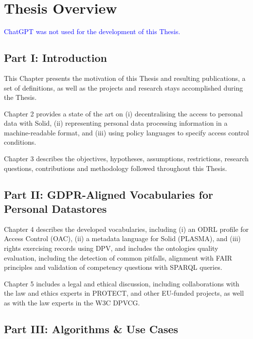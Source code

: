 \section{Thesis Overview}
\label{sec:thesis_overview}

\textcolor{blue}{ChatGPT was not used for the development of this Thesis.}

\subsection*{Part I: Introduction}

This Chapter presents the motivation of this Thesis and resulting publications, a set of definitions, as well as the projects and research stays accomplished during the Thesis.

Chapter 2 provides a state of the art on (i) decentralising the access to personal data with Solid, (ii) representing personal data processing information in a machine-readable format, and (iii) using policy languages to specify access control conditions.

Chapter 3 describes the objectives, hypotheses, assumptions, restrictions, research questions, contributions and methodology followed throughout this Thesis.

\subsection*{Part II: GDPR-Aligned Vocabularies for Personal Datastores}

Chapter 4 describes the developed vocabularies, including (i) an ODRL profile for Access Control (OAC), (ii) a metadata language for Solid (PLASMA), and (iii) rights exercising records using DPV, and includes the ontologies quality evaluation, including the detection of common pitfalls, alignment with FAIR principles and validation of competency questions with SPARQL queries.

Chapter 5 includes a legal and ethical discussion, including collaborations with the law and ethics experts in PROTECT, and other EU-funded projects, as well as with the law experts in the W3C DPVCG.

\subsection*{Part III: Algorithms \& Use Cases}


